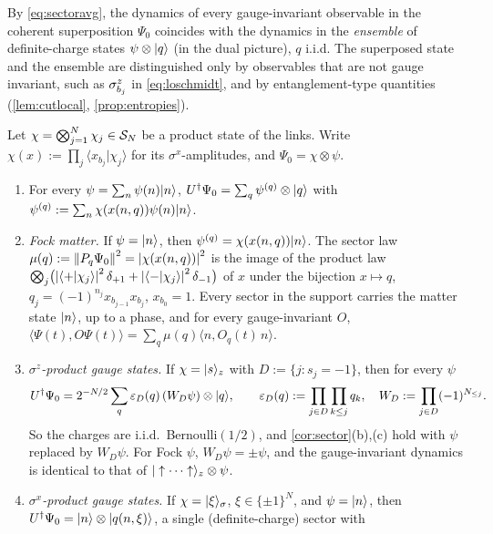 \begin{remark}\label{rem:superposition}
By \eqref{eq:sectoravg}, the dynamics of every gauge-invariant observable in the coherent
superposition $\Psi_0$ coincides with the dynamics in the \emph{ensemble} of definite-charge states
$\psi\otimes|q\rangle$ (in the dual picture), $q$ i.i.d.  The superposed state and the ensemble are
distinguished only by observables that are not gauge invariant, such as $\sigma^{z}_{b_{j}}$ in
\eqref{eq:loschmidt}, and by entanglement-type quantities (\cref{lem:cutlocal},
\cref{prop:entropies}).
\end{remark}

\begin{lemma}\label{lem:productlaw}
Let $\chi=\bigotimes_{j=1}^N\chi_j\in\mathcal{S}_N$ be a product state of the links.  Write
$\chi(x):=\prod_j\langle x_{b_j}|\chi_j\rangle$ for its $\sigma^x$-amplitudes, and
$\Psi_0=\chi\otimes\psi$.
\begin{enumerate}[label=(\alph*)]
\item For every $\psi=\sum_n\psi(n)|n\rangle$, $U^\dagger\Psi_0=\sum_q\psi^{(q)}\otimes|q\rangle$ with
$\psi^{(q)}:=\sum_n\chi(x(n,q))\psi(n)|n\rangle$.
\item \emph{Fock matter.}  If $\psi=|n\rangle$, then $\psi^{(q)}=\chi(x(n,q))|n\rangle$.  The sector law
$\mu(q):=\left\|P_q\Psi_0\right\|^2=\left|\chi(x(n,q))\right|^2$ is the image of the product law
$\bigotimes_j\bigl(\left|\langle+|\chi_j\rangle\right|^2\delta_{+1}+\left|\langle-|\chi_j\rangle\right|^2\delta_{-1}\bigr)$
of $x$ under the bijection $x\mapsto q$, $q_j=(-1)^{n_j}x_{b_{j-1}}x_{b_j}$, $x_{b_0}=1$.  Every
sector in the support carries the matter state $|n\rangle$, up to a phase, and for every gauge-invariant
$O$, $\langle\Psi(t),O\Psi(t)\rangle=\sum_q\mu(q)\langle n,O_q(t)\,n\rangle$.
\item \emph{$\sigma^z$-product gauge states.}  If $\chi=|s\rangle_z$ with $D:=\{j:s_j=-1\}$, then for every
$\psi$
\[
  U^\dagger\Psi_0=2^{-N/2}\sum_q\varepsilon_D(q)\,(W_D\psi)\otimes|q\rangle,\qquad
  \varepsilon_D(q):=\prod_{j\in D}\prod_{k\le j}q_k,\quad W_D:=\prod_{j\in D}(-1)^{N_{\le j}} .
\]
So the charges are i.i.d.\ Bernoulli$(1/2)$, and \cref{cor:sector}(b),(c) hold with $\psi$ replaced
by $W_D\psi$.  For Fock $\psi$, $W_D\psi=\pm\psi$, and the gauge-invariant dynamics is identical to
that of $|\uparrow\cdots\uparrow\rangle_z\otimes\psi$.
\item \emph{$\sigma^x$-product gauge states.}  If $\chi=|\xi\rangle_\sigma$, $\xi\in\{\pm1\}^N$, and
$\psi=|n\rangle$, then $U^\dagger\Psi_0=|n\rangle\otimes|q(n,\xi)\rangle$, a single (definite-charge) sector with

\end{enumerate}
\end{lemma}

